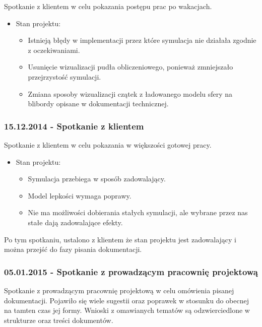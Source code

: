 \documentclass[polish, 12pt]{aghthesis}
\begin{document}
			Spotkanie z klientem w celu pokazania postępu prac po wakacjach. 
			
			\begin{itemize}
			\item Stan projektu:
				\begin{itemize}
					\item Istnieją błędy w implementacji przez które symulacja nie działała zgodnie z oczekiwaniami.
					\item Usunięcie wizualizacji pudła obliczeniowego, ponieważ zmniejszało przejrzystość symulacji.
					\item Zmiana sposoby wizualizacji czątek z ładowanego modelu sfery na blibordy opisane w dokumentacji technicznej.
				\end{itemize}
			\end{itemize}
			
		
		\subsubsection*{15.12.2014 - Spotkanie z klientem}
		
			Spotkanie z klientem w celu pokazania w większości gotowej pracy.
			
			\begin{itemize}
			\item Stan projektu:
				\begin{itemize}
					\item Symulacja przebiega w sposób zadowalający.
					\item Model lepkości wymaga poprawy.
					\item Nie ma możliwości dobierania stałych symulacji, ale wybrane przez nas stałe dają zadowalające efekty.
				\end{itemize}
			\end{itemize}
			
			Po tym spotkaniu, ustalono z klientem że stan projektu jest zadowalający i można przejść do fazy pisania dokumentacji.
			
		\subsubsection*{05.01.2015 - Spotkanie z prowadzącym pracownię projektową}
		
		Spotkanie z prowadzącym pracownię projektową w celu omówienia pisanej dokumentacji. Pojawiło się wiele sugestii oraz poprawek w stosunku do obecnej na tamten czas jej formy. Wnioski z omawianych tematów są odzwierciedlone w strukturze oraz treści dokumentów.
		
\end{document}
